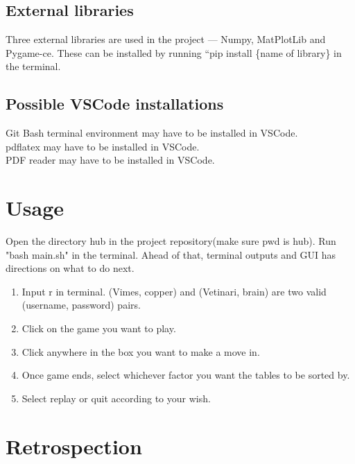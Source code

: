 \documentclass[12pt]{article}
\begin{document}
\subsection{External libraries}
Three external libraries are used in the project — Numpy, MatPlotLib and Pygame-ce. These can be installed by running ``pip install \{name of library\} in the terminal. 
\subsection {Possible VSCode installations} 
Git Bash terminal environment may have to be installed in VSCode. \\ 
pdflatex may have to be installed in VSCode. \\
PDF reader may have to be installed in VSCode. \\

\section{Usage}

Open the directory hub in the project repository(make sure pwd is hub). Run "bash main.sh"
in the terminal. Ahead of that, terminal outputs and GUI has directions on what to do next.
\begin{enumerate}
    \item Input r in terminal. (Vimes, copper) and (Vetinari, brain) are two valid (username, password) pairs. 
    \item Click on the game you want to play.
    \item Click anywhere in the box you want to make a move in. 
    \item Once game ends, select whichever factor you want the tables to be sorted by. 
    \item Select replay or quit according to your wish.
\end{enumerate}

\section{Retrospection} 
\end{document}
